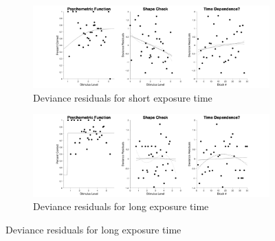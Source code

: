 \documentclass{article}
\begin{document}
\begin{figure}[!hb]
    \begin{subfigure}{\textwidth}
        \centering
        \includegraphics[width = \linewidth]{Thesis/plots/gof/segDist/segDist_re_short_deviance.png}
        \caption{Deviance residuals for short exposure time}
    \end{subfigure}
    
    \begin{subfigure}{\textwidth}
        \centering
        \includegraphics[width = \linewidth]{Thesis/plots/gof/segDist/segDist_re_long_deviance.png}
        \caption{Deviance residuals for long exposure time}
    \end{subfigure}
\end{figure}

\clearpage
\end{document}
